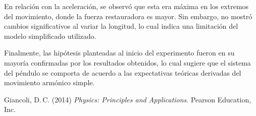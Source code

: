 \documentclass[letterpaper]{report}
\numberwithin{table}{section}
\begin{document}
En relación con la aceleración, se observó que esta era máxima en los
extremos del movimiento, donde la fuerza restauradora es mayor. Sin
embargo, no mostró cambios significativos al variar la longitud, lo
cual indica una limitación del modelo simplificado utilizado.

Finalmente, las hipótesis planteadas al inicio del experimento fueron
en su mayoría confirmadas por los resultados obtenidos, lo cual
sugiere que el sistema del péndulo se comporta de acuerdo a las
expectativas teóricas derivadas del movimiento armónico simple.

\renewcommand{\refname}{Bibliografía}
\begin{thebibliography}{1}
  \bibitem{}
  Giancoli, D.\,C. (2014) \textit{Physics: Principles and
  Applications}. Pearson Education, Inc.
\end{thebibliography}
\end{document}
